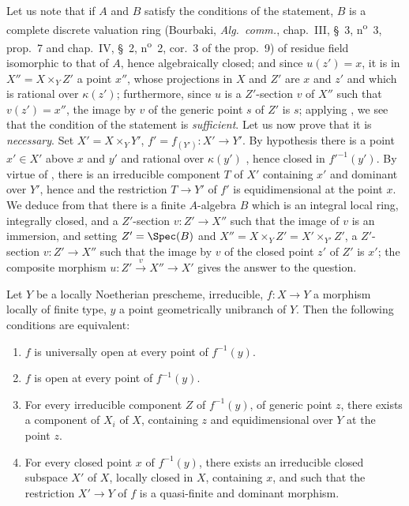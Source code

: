 Let us note that if $A$ and $B$ satisfy the conditions of the statement, $B$ is a complete discrete valuation ring (Bourbaki, \emph{Alg.\ comm.}, chap.~III, \S~3, n\textsuperscript{o}~3, prop.~7 and chap.~IV, \S~2, n\textsuperscript{o}~2, cor.~3 of the prop.~9) of residue field isomorphic to that of $A$, hence algebraically closed; and since $u(z')=x$, it is in $X''=X\times_Y Z'$ a point $x''$, whose projections in $X$ and $Z'$ are $x$ and $z'$ and which is rational over $\kappa(z')$; furthermore, since $u$ is a $Z'$-section $v$ of $X''$ such that $v(z')=x''$, the image by $v$ of the generic point $s$ of $Z'$ is $s$; applying , we see that the condition of the statement is \emph{sufficient}.
Let us now prove that it is \emph{necessary}.
Set $X'=X\times_Y Y'$, $f'=f_{(Y')}:X'\to Y'$.
By hypothesis there is a point $x'\in X'$ above $x$ and $y'$ and rational over $\kappa(y')$ , hence closed in $f'^{-1}(y')$.
By virtue of , there is an irreducible component $T$ of $X'$ containing $x'$ and dominant over $Y'$, hence  and  the restriction $T\to Y'$ of $f'$ is equidimensional at the point $x$.
We deduce from  that there is a finite $A$-algebra $B$ which is an integral local ring, integrally closed, and a $Z'$-section $v:Z'\to X''$ such that the image of $v$ is an immersion, and setting $Z'=\Spec(B)$ and $X''=X\times_Y Z'=X'\times_{Y'} Z'$, a $Z'$-section $v:Z'\to X''$ such that the image by $v$ of the closed point $z'$ of $Z'$ is $x'$; the composite morphism $u:Z'\xrightarrow{v}X''\to X'$ gives the answer to the question.

\begin{proposition}[14.5.9]
\label{IV.14.5.9}
Let $Y$ be a locally Noetherian prescheme, irreducible, $f:X\to Y$ a morphism locally of finite type, $y$ a point geometrically unibranch of $Y$.
Then the following conditions are equivalent:
\begin{enumerate}[label=\emph{\alph*)}]
  \item $f$ is universally open at every point of $f^{-1}(y)$.
  \item $f$ is open at every point of $f^{-1}(y)$.
  \item For every irreducible component $Z$ of $f^{-1}(y)$, of generic point $z$, there exists a component of $X_i$ of $X$, containing $z$ and equidimensional over $Y$ at the point $z$.
  \item For every closed point $x$ of $f^{-1}(y)$, there exists an irreducible closed subspace $X'$ of $X$, locally closed in $X$, containing $x$, and such that the restriction $X'\to Y$ of $f$ is a quasi-finite and dominant morphism.
\end{enumerate}
\end{proposition}

